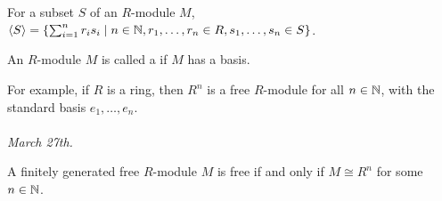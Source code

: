 \begin{proposition}
    For a subset $S$ of an $R$-module $M$, $\langle S\rangle = \{\sum_{i=1}^{n} r_{i}s_{i} \mid n \in \mathbb{N}, r_{1},\ldots,r_{n} \in R, s_{1},\ldots,s_{n} \in S\}$.
\end{proposition}

\begin{definition}
    An $R$-module $M$ is called a  if $M$ has a basis.
\end{definition}

For example, if $R$ is a ring, then $R^{n}$ is a free $R$-module for all $n \in \mathbb{N}$, with the standard basis $e_{1},\ldots,e_{n}$.
\\ \\
\noindent \textit{March 27th.}

\begin{proposition}
    A finitely generated free $R$-module $M$ is free if and only if $M \cong R^{n}$ for some $n \in \mathbb{N}$.
\end{proposition}
